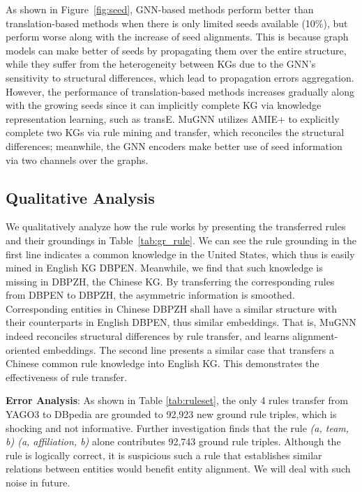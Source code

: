 \documentclass[11pt,a4paper]{article}
\begin{document}
As shown in Figure~\ref{fig:seed}, GNN-based methods perform better than translation-based methods when there is only limited seeds available (10\%), but perform worse along with the increase of seed alignments. This is because graph models can make better of seeds by propagating them over the entire structure, while they suffer from the heterogeneity between KGs due to the GNN's sensitivity to structural differences, which lead to propagation errors aggregation. However, the performance of translation-based methods increases gradually along with the growing seeds since it can implicitly complete KG via knowledge representation learning, such as transE. MuGNN utilizes AMIE+ to explicitly complete two KGs via rule mining and transfer, which reconciles the structural differences; meanwhile, the GNN encoders make better use of seed information via two channels over the graphs.

\subsection{Qualitative Analysis}

We qualitatively analyze how the rule works by presenting the transferred rules and their groundings in Table~\ref{tab:gr_rule}. We can see the rule grounding in the first line indicates a common knowledge in the United States, which thus is easily mined in English KG DBP{\tiny EN}. Meanwhile, we find that such knowledge is missing in DBP{\tiny ZH}, the Chinese KG. By transferring the corresponding rules from DBP{\tiny EN} to DBP{\tiny ZH}, the asymmetric information is smoothed. Corresponding entities in Chinese DBP{\tiny ZH} shall have a similar structure with their counterparts in English DBP{\tiny EN}, thus similar embeddings. That is, MuGNN indeed reconciles structural differences by rule transfer, and learns alignment-oriented embeddings. The second line presents a similar case that transfers a Chinese common rule knowledge into English KG. This demonstrates the effectiveness of rule transfer.


\noindent\textbf{Error Analysis}: As shown in Table \ref{tab:ruleset}, the only 4 rules transfer from YAGO3 to DBpedia are grounded to 92,923 new ground rule triples, which is shocking and not informative. Further investigation finds that the rule \emph{(a, team, b)  (a, affiliation, b)} alone contributes 92,743 ground rule triples. Although the rule is logically correct, it is suspicious such a rule that establishes similar relations between entities would benefit entity alignment. We will deal with such noise in future.
\end{document}
